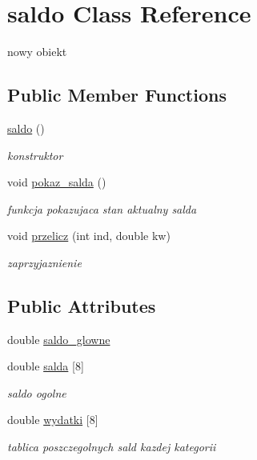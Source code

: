 \hypertarget{classsaldo}{}\section{saldo Class Reference}
\label{classsaldo}


nowy obiekt  


\subsection*{Public Member Functions}
\begin{DoxyCompactItemize}
\item 
\hyperlink{classsaldo_a617c8b0acdc5eb26c14f9af32e90470c}{saldo} ()
\begin{DoxyCompactList}\small\item\em konstruktor \end{DoxyCompactList}\item 
void \hyperlink{classsaldo_a25d8b15abd41ecd9bc358e2bf102018c}{pokaz\+\_\+salda} ()
\begin{DoxyCompactList}\small\item\em funkcja pokazujaca stan aktualny salda \end{DoxyCompactList}\item 
void \hyperlink{classsaldo_a98b3fbfb98e5725dd69027a58a213498}{przelicz} (int ind, double kw)
\begin{DoxyCompactList}\small\item\em zaprzyjaznienie \end{DoxyCompactList}\end{DoxyCompactItemize}
\subsection*{Public Attributes}
\begin{DoxyCompactItemize}
\item 
double \hyperlink{classsaldo_abd8845ce94069af37be227ab71b038e9}{saldo\+\_\+glowne}
\item 
double \hyperlink{classsaldo_a665a791a5ed810485df4a9e2ddf31d93}{salda} \mbox{[}8\mbox{]}
\begin{DoxyCompactList}\small\item\em saldo ogolne \end{DoxyCompactList}\item 
double \hyperlink{classsaldo_a7a7b00d8994a0322418f92436753164e}{wydatki} \mbox{[}8\mbox{]}
\begin{DoxyCompactList}\small\item\em tablica poszczegolnych sald kazdej kategorii \end{DoxyCompactList}\end{DoxyCompactItemize}
